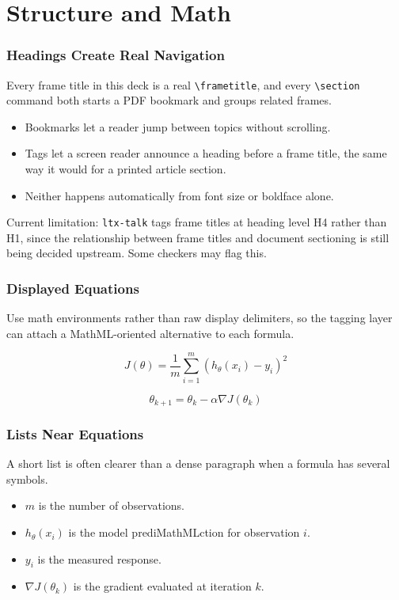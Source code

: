 \documentclass[aspect-ratio=16:9]{ltx-talk}
\begin{document}
\section{Structure and Math}

\begin{frame}
	\frametitle{Headings Create Real Navigation}
	Every frame title in this deck is a real \texttt{\textbackslash frametitle}, and every \texttt{\textbackslash section} command both starts a PDF bookmark and groups related frames.

	\begin{itemize}
		\item Bookmarks let a reader jump between topics without scrolling.
		\item Tags let a screen reader announce a heading before a frame title, the same way it would for a printed article section.
		\item Neither happens automatically from font size or boldface alone.
	\end{itemize}

	\alert{Current limitation:} \texttt{ltx-talk} tags frame titles at heading level H4 rather than H1, since the relationship between frame titles and document sectioning is still being decided upstream. Some checkers may flag this.
\end{frame}

\begin{frame}
	\frametitle{Displayed Equations}
	Use math environments rather than raw display delimiters, so the tagging layer can attach a MathML-oriented alternative to each formula.

	\begin{equation}
		J(\theta)=\frac{1}{m}\sum_{i=1}^{m}\left(h_\theta(x_i)-y_i\right)^2
		\label{eq:objective}
	\end{equation}

	\begin{equation}
		\theta_{k+1}=\theta_k-\alpha\nabla J(\theta_k)
		\label{eq:gradient-update}
	\end{equation}
\end{frame}

\begin{frame}
	\frametitle{Lists Near Equations}
	A short list is often clearer than a dense paragraph when a formula has several symbols.

	\begin{itemize}
		\item $m$ is the number of observations.
		\item $h_\theta(x_i)$ is the model prediMathMLction for observation $i$.
		\item $y_i$ is the measured response.
		\item $\nabla J(\theta_k)$ is the gradient evaluated at iteration $k$.
	\end{itemize}
\end{frame}
\end{document}
